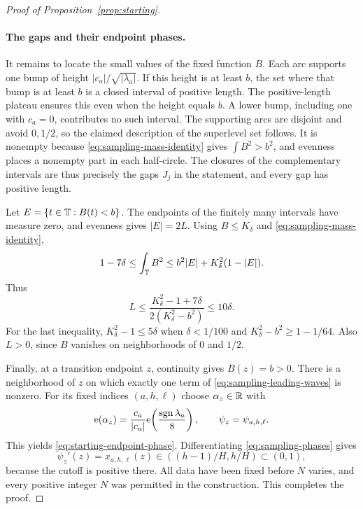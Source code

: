 \begin{proof}[Proof of Proposition~\ref{prop:starting}]
\paragraph{The gaps and their endpoint phases.}
It remains to locate the small values of the fixed function $B$.
Each arc supports one bump of height $|c_a|/\sqrt{|\lambda_a|}$.
If this height is at least $b$, the set where that bump is at least
$b$ is a closed interval of positive length.  The positive-length
plateau ensures this even when the height equals $b$.  A lower bump,
including one with $c_a=0$, contributes no such interval.
The supporting arcs are disjoint and avoid $0,1/2$, so the claimed
description of the superlevel set follows.  It is nonempty because
\eqref{eq:sampling-mass-identity} gives $\int B^2>b^2$, and evenness
places a nonempty part in each half-circle.  The closures of the
complementary intervals are thus precisely the gaps $J_j$ in the
statement, and every gap has positive length.

Let $E=\{t\in\mathbb T:B(t)<b\}$.  The endpoints of the finitely many
intervals have measure zero, and evenness gives $|E|=2L$.
Using $B\le K_\delta$ and \eqref{eq:sampling-mass-identity},
\[
 1-7\delta\le\int_\mathbb T B^2
 \le b^2|E|+K_\delta^2(1-|E|).
\]
Thus
\begin{equation}
 \label{eq:sampling-gap-measure}
 L\le\frac{K_\delta^2-1+7\delta}
              {2(K_\delta^2-b^2)}\le10\delta.
\end{equation}
For the last inequality, $K_\delta^2-1\le5\delta$ when
$\delta<1/100$ and $K_\delta^2-b^2\ge1-1/64$.
Also $L>0$, since $B$ vanishes on neighborhoods of $0$ and $1/2$.

Finally, at a transition endpoint $z$, continuity gives $B(z)=b>0$.
There is a neighborhood of $z$ on which exactly one term of
\eqref{eq:sampling-leading-waves} is nonzero.  For its fixed indices
$(a,h,\ell)$ choose $\alpha_z\in\mathbb R$ with
\[
 \mathrm e(\alpha_z)=\frac{c_a}{|c_a|}
                 \mathrm e\!\left(\frac{\operatorname{sgn}\lambda_a}{8}\right),
 \qquad \psi_z=\psi_{a,h,\ell}.
\]
This yields \eqref{eq:starting-endpoint-phase}.  Differentiating
\eqref{eq:sampling-phases} gives
\[
 \psi_z'(z)=x_{a,h,\ell}(z)\in((h-1)/H,h/H)\subset(0,1),
\]
because the cutoff is positive there.  All data have been fixed
before $N$ varies, and every positive integer $N$ was permitted in
the construction.  This completes the proof.
\end{proof}
